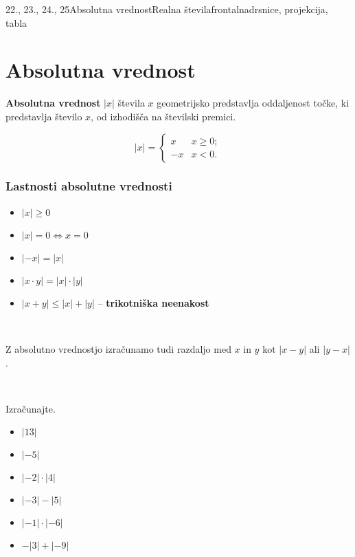 \begin{priprava}{22., 23., 24., 25}{}{Absolutna vrednost}{Realna števila}{frontalna}{drsnice, projekcija, tabla}
    
    \section{Absolutna vrednost}

        
    \textbf{Absolutna vrednost} $|x|$ števila $x$ geometrijsko predstavlja oddaljenost točke, 
    ki predstavlja število $x$, od izhodišča na številski premici.



    $$|x|=\begin{cases} x &x\geq 0; \\ -x & x<0. \end{cases}$$


\subsubsection*{Lastnosti absolutne vrednosti}
            \begin{itemize}
                \item $|x|\geq 0$
                \item $|x|=0 \Leftrightarrow x=0$
                \item $|-x|=|x|$
                \item $|x\cdot y|=|x|\cdot|y|$
                \item $|x+y|\leq |x|+|y|$ -- \textbf{trikotniška neenakost}
            \end{itemize}

~


    Z absolutno vrednostjo izračunamo tudi razdaljo med $x$ in $y$ kot $|x-y|$ ali $|y-x|$.

~~~\\



\begin{multicols}{2}


\begin{naloga}
    Izračunajte.
    \begin{itemize}
        \item $|13|$ 
        \item $|-5|$ 
        \item $|-2|\cdot|4|$ 
        \item $|-3|-|5|$ 
        \item $|-1|\cdot|-6|$ 
        \item $-|3|+|-9|$ 
            

\end{itemize}
\end{naloga}
\end{multicols}
\end{priprava}
